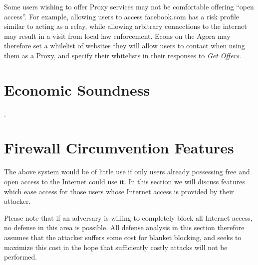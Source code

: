 \documentclass{article}
\begin{document}
Some users wishing to offer Proxy services may not be comfortable offering ``open access''. For example, allowing users to access facebook.com has a risk profile similar to acting as a relay, while allowing arbitrary connections to the internet may result in a visit from local law enforcement. Econs on the Agora may therefore set a whilelist of websites they will allow users to contact when using them as a Proxy, and specify their whitelists in their responses to \emph{Get Offers}.





\section{Economic Soundness}
\label{sec:economic-soundness}

.

\section{Firewall Circumvention Features}
\label{sec:evasion}

The above system would be of little use if only users already
possessing free and open access to the Internet could use it. In this
section we will discuss features which ease access for those users
whose Internet access is provided by their attacker.

Please note that if an adversary is willing to completely block all
Internet access, no defense in this area is possible. All defense
analysis in this section therefore assumes that the attacker suffers
some cost for blanket blocking, and seeks to maximize this cost in the
hope that sufficiently costly attacks will not be performed.
\end{document}
